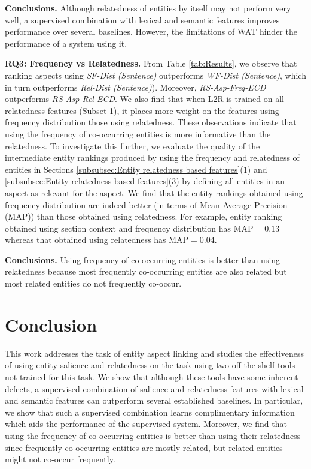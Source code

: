 \documentclass[sigconf,authordraft]{acmart}
\begin{document}
\textbf{Conclusions.}
Although relatedness of entities by itself may not perform very well, a supervised combination with lexical and semantic features improves performance over several baselines. However, the limitations of WAT hinder the performance of a system using it.


\textbf{RQ3: Frequency vs Relatedness.}
From Table \ref{tab:Results}, we observe that ranking aspects using \textit{SF-Dist (Sentence)} outperforms \textit{WF-Dist (Sentence)}, which in turn outperforms \textit{Rel-Dist (Sentence)}). Moreover, \textit{RS-Asp-Freq-ECD} outperforms \textit{RS-Asp-Rel-ECD}. We also find that when L2R is trained on all relatedness features (Subset-1), it places more weight on the features using frequency distribution those using relatedness. These observations indicate that using the frequency of co-occurring entities is more informative than the relatedness. To investigate this further, we evaluate the quality of the intermediate entity rankings produced by using the frequency and relatedness of entities in Sections \ref{subsubsec:Entity relatedness based features}(1) and \ref{subsubsec:Entity relatedness based features}(3) by defining all entities in an aspect as relevant for the aspect. We find that the entity rankings obtained using frequency distribution are indeed better (in terms of Mean Average Precision (MAP)) than those obtained using relatedness. For example, entity ranking obtained using section context and frequency distribution has $\text{MAP}=0.13$ whereas that obtained using relatedness has $\text{MAP}=0.04$. 

\textbf{Conclusions.} Using frequency of co-occurring entities is better than using relatedness because most frequently co-occurring entities are also related but most related entities do not frequently co-occur.

\section{Conclusion}
\label{sec:Conclusion}
This work addresses the task of entity aspect linking and studies the effectiveness of using entity salience and relatedness on the task using two off-the-shelf tools not trained for this task. We show that although these tools have some inherent defects, a supervised combination of salience and relatedness features with lexical and semantic features can outperform several established baselines. In particular, we show that such a supervised combination learns complimentary information which aids the performance of the supervised system. Moreover, we find that using the frequency of co-occurring entities is better than using their relatedness since frequently co-occurring entities are mostly related, but related entities might not co-occur frequently. 



\end{document}
